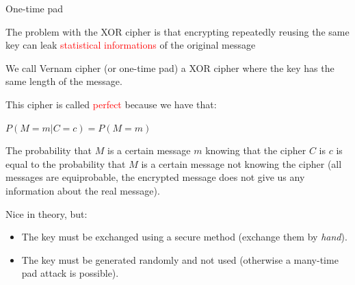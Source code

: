 \begin{frame}{One-time pad}

  \pause

  The problem with the XOR cipher is that encrypting repeatedly reusing the same key can leak \textcolor{red}{statistical informations} of the original message  
  
  \medskip
  
  We call Vernam cipher (or one-time pad) a XOR cipher where the key has the same length of the message. 
  
  \smallskip
  
  This cipher is called \textcolor{red}{perfect} because we have that:
  
  \medskip
  
  \phantom{pad}$P(M = m | C = c) = P(M = m)$
  
  \medskip
  
  The probability that $M$ is a certain message $m$ knowing that the cipher $C$ is $c$ is equal to the probability that $M$ is a certain message not knowing the cipher (all messages are equiprobable, the encrypted message does not give us any information about the real message).
  
  \medskip
  
  \pause

  Nice in theory, but:
  
  \begin{itemize}
    \item The key must be exchanged using a secure method (exchange them by \textit{hand}).
    \item The key must be generated randomly and not used (otherwise a many-time pad attack is possible).
  \end{itemize}

\end{frame}

